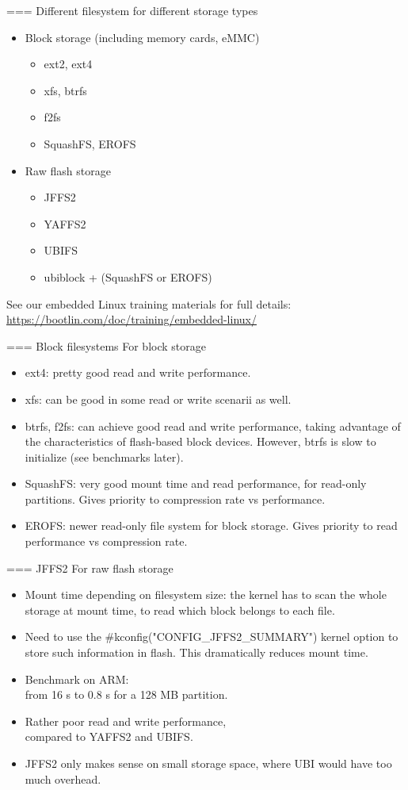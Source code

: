 === Different filesystem for different storage types
\begin{itemize}
\item Block storage (including memory cards, eMMC)
      \begin{itemize}
      \item ext2, ext4
      \item xfs, btrfs
      \item f2fs
      \item SquashFS, EROFS
      \end{itemize}
\item Raw flash storage
      \begin{itemize}
      \item JFFS2
      \item YAFFS2
      \item UBIFS
      \item ubiblock + (SquashFS or EROFS)
      \end{itemize}
\end{itemize}
See our embedded Linux training materials for full details:
{\small
\url{https://bootlin.com/doc/training/embedded-linux/}
}


=== Block filesystems For block storage
\begin{itemize}
\item ext4: pretty good read and write performance.
\item xfs: can be good in some read or write scenarii
      as well.
\item btrfs, f2fs: can achieve good read and write performance,
      taking advantage of the characteristics of flash-based block
      devices. However, btrfs is slow to initialize (see benchmarks later).
\item SquashFS: very good mount time and read performance, for read-only
      partitions. Gives priority to compression rate vs performance.
\item EROFS: newer read-only file system for block storage. Gives
      priority to read performance vs compression rate.
\end{itemize}


=== JFFS2
For raw flash storage
\begin{itemize}
\item Mount time depending on filesystem size: the kernel has to
      scan the whole storage at mount time, to read which block
      belongs to each file.
\item Need to use the #kconfig("CONFIG_JFFS2_SUMMARY") kernel option
      to store such information in flash. This dramatically reduces
      mount time.
\item Benchmark on ARM:\\
      from 16 s to 0.8 s for a 128 MB partition.
\item Rather poor read and write performance,\\
      compared to YAFFS2 and UBIFS.
\item JFFS2 only makes sense on small storage space,
      where UBI would have too much overhead.
\end{itemize}


